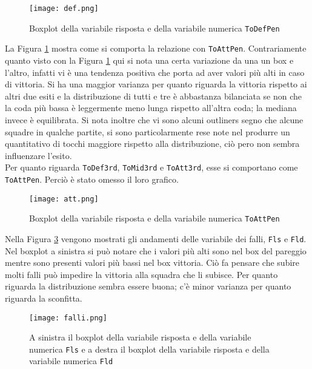 \begin{figure}[htbp]
	\begin{center}
		\texttt{[image: def.png]}
		\caption{Boxplot della variabile risposta e della variabile numerica \texttt{ToDefPen} } \label{fig:defp}
	\end{center}
\end{figure}

La Figura \ref{fig:defp} mostra come si comporta la relazione con \texttt{ToAttPen}. Contrariamente quanto visto con la Figura \ref{fig:defp} qui si nota una certa variazione da una un box e l'altro, infatti vi è una tendenza positiva che porta ad aver valori più alti in caso di vittoria. Si ha una maggior varianza per quanto riguarda la vittoria rispetto ai altri due esiti e la distribuzione di tutti e tre è abbastanza bilanciata se non che la coda più bassa è leggermente meno lunga rispetto all'altra coda; la mediana invece è equilibrata. Si nota inoltre che vi sono alcuni outliners segno che alcune squadre in qualche partite, si sono particolarmente rese note nel produrre un quantitativo di tocchi maggiore rispetto alla distribuzione, ciò pero non sembra influenzare l'esito.\\

Per quanto riguarda \texttt{ToDef3rd}, \texttt{ToMid3rd} e \texttt{ToAtt3rd}, esse si comportano come \texttt{ToAttPen}. Perciò è stato omesso il loro grafico.\\

\begin{figure}[htbp]
	\begin{center}
		\texttt{[image: att.png]}
		\caption{Boxplot della variabile risposta e della variabile numerica \texttt{ToAttPen} } \label{fig:att}
	\end{center}
\end{figure}

Nella Figura \ref{fig:falli} vengono mostrati gli andamenti delle variabile dei falli, \texttt{Fls} e \texttt{Fld}. Nel boxplot a sinistra si può notare che i valori più alti sono nel box del pareggio mentre sono presenti valori più bassi nel box vittoria. Ciò fa pensare che subire molti falli può impedire la vittoria alla squadra che li subisce. Per quanto riguarda la distribuzione sembra essere buona; c'è minor varianza per quanto riguarda la sconfitta. \\

\begin{figure}[htbp]
	\begin{center}
		\texttt{[image: falli.png]}
		\caption{A sinistra il boxplot della variabile risposta e della variabile numerica \texttt{Fls} e a destra il boxplot della variabile risposta e della variabile numerica \texttt{Fld} } \label{fig:falli}
	\end{center}
\end{figure}

